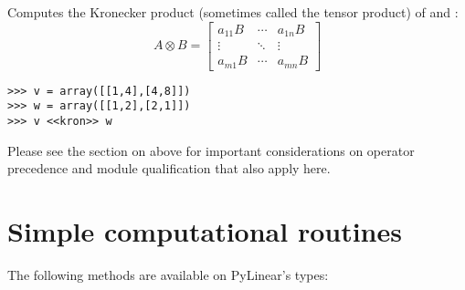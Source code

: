 \begin{itemize}
  Computes the Kronecker product 
  (sometimes called the tensor product) 
  of  and :
  \[%
    A \otimes B = 
    \begin{bmatrix} a_{11} B & \cdots & a_{1n}B \\ \vdots & 
    \ddots & \vdots \\ a_{m1} B & \cdots & a_{mn} B \end{bmatrix}
  \]

\begin{verbatim}
>>> v = array([[1,4],[4,8]])
>>> w = array([[1,2],[2,1]])
>>> v <<kron>> w
\end{verbatim}

  Please see the section on  above for important
  considerations on operator precedence and module qualification
  that also apply here.

\end{itemize}

\section{Simple computational routines}

The following methods are available on PyLinear's  types:

